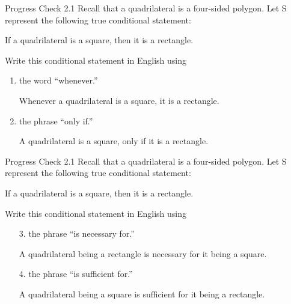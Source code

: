 \documentclass{beamer}
\begin{document}
\begin{frame}{Progress Check 2.1}
	Recall that a quadrilateral is a four-sided polygon. Let S represent the following
	true conditional statement:
	\begin{center}
		If a quadrilateral is a square, then it is a rectangle.
	\end{center}
	Write this conditional statement in English using
	\begin{enumerate}
		\item the word ``whenever.''\\[.1 in] \pause
		\begin{center}
			Whenever a quadrilateral is a square, it is a rectangle.\\[.1 in] \pause
		\end{center}
		\item the phrase ``only if.''\\[.1 in] \pause
		\begin{center}
			A quadrilateral is a square, only if it is a rectangle.\\[.1 in] 
		\end{center}
	\end{enumerate}
\end{frame}

\begin{frame}{Progress Check 2.1}
	Recall that a quadrilateral is a four-sided polygon. Let S represent the following
	true conditional statement:
	\begin{center}
		If a quadrilateral is a square, then it is a rectangle.
	\end{center}
	Write this conditional statement in English using
	\begin{enumerate}
		\item[3.] the phrase ``is necessary for.''\\[.1 in] \pause
		\begin{center}
			A quadrilateral being a rectangle is necessary for it being a square.\\[.1 in] \pause
		\end{center}
		\item[4.] the phrase ``is sufficient for.''\\[.1 in] \pause
		\begin{center}
			A quadrilateral being a square is sufficient for it being a rectangle.\\[.1 in]
		\end{center}
	\end{enumerate}
\end{frame}
\end{document}
